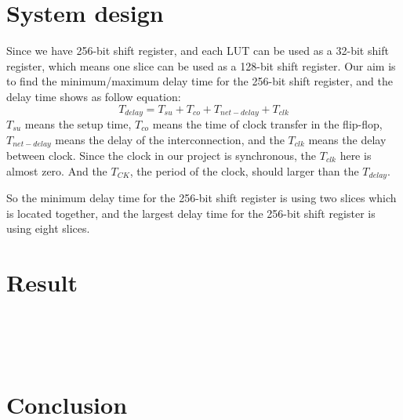 \documentclass[12pt]{article}
\begin{document}
\section{System design}  \label{a3}
Since we have 256-bit shift register, and each LUT can be used as a 32-bit shift register, which means one slice can be used as a 128-bit shift register. Our aim is to find the minimum/maximum delay time for the 256-bit shift register, and the delay time shows as follow equation:
$$T_{delay}=T_{su}+T_{co}+T_{net-delay}+T_{clk}$$
$T_{su}$ means the setup time, $T_{co}$ means the time of clock transfer in the flip-flop, $T_{net-delay}$ means the delay of the interconnection, and the $T_{clk}$ means the delay between clock. Since the clock in our project is synchronous, the $T_{clk}$ here is almost zero. And the $T_{CK}$, the period of the clock, should larger than the $T_{delay}$.

So the minimum delay time for the 256-bit shift register is using two slices which is located together, and the largest delay time for the 256-bit shift register is using eight slices.
 

\section{Result}  \label{a4}

\lipsum[1]\\
\lipsum[1]\\
\lipsum[1]\\

\section{Conclusion}  \label{a5}

\newpage


\end{document}

